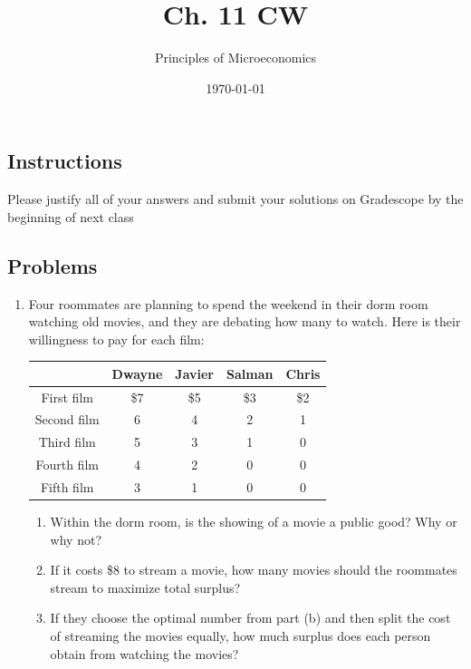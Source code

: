 \documentclass{article}
\title{Ch. 11 CW}
\author{Principles of Microeconomics}
\date{\today}
\begin{document}
\maketitle

\subsection*{Instructions} Please justify all of your answers and submit your solutions on Gradescope by the beginning of next class

\subsection*{Problems}

\begin{enumerate}

\item Four roommates are planning to spend the weekend in their dorm room watching old movies, and they are debating how many to watch. Here is their willingness to pay for each film:

\begin{center}
\begin{tabular}{| c | c | c | c | c |}
\hline
& Dwayne & Javier & Salman & Chris \\
\hline
First film & \$7 & \$5 & \$3 & \$2 \\
\hline 
Second film & 6 & 4 & 2 & 1 \\
\hline 
Third film & 5 & 3 & 1 & 0 \\
\hline 
Fourth film & 4 & 2 & 0 & 0 \\
\hline 
Fifth film & 3 & 1 & 0 & 0 \\
\hline
\end{tabular}
\end{center}

	\begin{enumerate}
	
	\item Within the dorm room, is the showing of a movie a public good? Why or why not?
	
	\item If it costs \$8 to stream a movie, how many movies should the roommates stream to maximize total surplus?
	
	\item If they choose the optimal number from part (b) and then split the cost of streaming the movies equally, how much surplus does each person obtain from watching the movies? 
	

\end{enumerate}
\end{enumerate}
\end{document}
